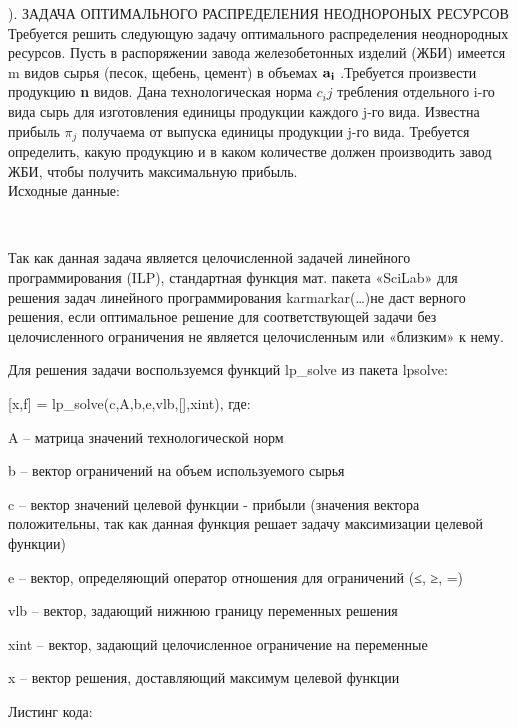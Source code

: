 \documentclass[russian,utf8,nocolumnxxxi,nocolumnxxxii]{eskdtext}
\begin{document}
). ЗАДАЧА ОПТИМАЛЬНОГО РАСПРЕДЕЛЕНИЯ НЕОДНОРОНЫХ РЕСУРСОВ\\
Требуется решить следующую задачу оптимального распределения неоднородных ресурсов. Пусть в распоряжении завода железобетонных изделий (ЖБИ) имеется m видов сырья (песок, щебень, цемент) в объемах ${\bf a_i}$  .Требуется произвести продукцию {\bf n} видов. Дана технологическая норма $c_ij$  требления отдельного i-го вида сырь для изготовления единицы продукции каждого j-го вида. Известна прибыль $\pi_j$  получаема от выпуска единицы продукции j-го вида. Требуется определить, какую продукцию и в каком количестве должен производить завод ЖБИ, чтобы получить максимальную прибыль.\\
Исходные данные:\\
\begin{figure}[H]
\begin{center}
\begin{minipage}[h]{0.65\linewidth}
  \\
\end{minipage}
\end{center}
\end{figure}
Так как данная задача является целочисленной задачей линейного программирования (ILP), стандартная функция мат. пакета «SciLab» для решения задач линейного программирования karmarkar(…)не даст верного решения, если оптимальное решение для соответствующей задачи без целочисленного ограничения не является целочисленным или «близким» к нему.

Для решения задачи воспользуемся функций lp_solve из пакета lpsolve:

[x,f] = lp\_solve(c,A,b,e,vlb,[],xint), где:

A – матрица значений технологической норм

b – вектор ограничений на объем используемого сырья

c – вектор значений целевой функции - прибыли (значения вектора положительны, так как данная функция решает задачу максимизации целевой функции)

e – вектор, определяющий оператор отношения для ограничений (≤, ≥, =)

vlb – вектор, задающий нижнюю границу переменных решения

xint – вектор, задающий целочисленное ограничение на переменные

x – вектор решения, доставляющий максимум целевой функции

Листинг кода:
\end{document}
